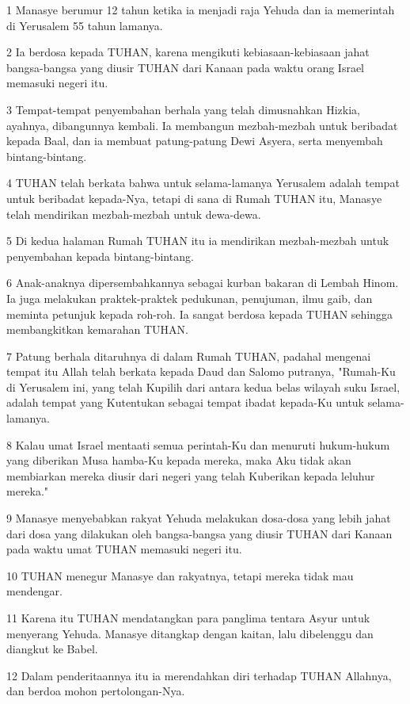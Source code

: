 \par 1 Manasye berumur 12 tahun ketika ia menjadi raja Yehuda dan ia memerintah di Yerusalem 55 tahun lamanya.
\par 2 Ia berdosa kepada TUHAN, karena mengikuti kebiasaan-kebiasaan jahat bangsa-bangsa yang diusir TUHAN dari Kanaan pada waktu orang Israel memasuki negeri itu.
\par 3 Tempat-tempat penyembahan berhala yang telah dimusnahkan Hizkia, ayahnya, dibangunnya kembali. Ia membangun mezbah-mezbah untuk beribadat kepada Baal, dan ia membuat patung-patung Dewi Asyera, serta menyembah bintang-bintang.
\par 4 TUHAN telah berkata bahwa untuk selama-lamanya Yerusalem adalah tempat untuk beribadat kepada-Nya, tetapi di sana di Rumah TUHAN itu, Manasye telah mendirikan mezbah-mezbah untuk dewa-dewa.
\par 5 Di kedua halaman Rumah TUHAN itu ia mendirikan mezbah-mezbah untuk penyembahan kepada bintang-bintang.
\par 6 Anak-anaknya dipersembahkannya sebagai kurban bakaran di Lembah Hinom. Ia juga melakukan praktek-praktek pedukunan, penujuman, ilmu gaib, dan meminta petunjuk kepada roh-roh. Ia sangat berdosa kepada TUHAN sehingga membangkitkan kemarahan TUHAN.
\par 7 Patung berhala ditaruhnya di dalam Rumah TUHAN, padahal mengenai tempat itu Allah telah berkata kepada Daud dan Salomo putranya, "Rumah-Ku di Yerusalem ini, yang telah Kupilih dari antara kedua belas wilayah suku Israel, adalah tempat yang Kutentukan sebagai tempat ibadat kepada-Ku untuk selama-lamanya.
\par 8 Kalau umat Israel mentaati semua perintah-Ku dan menuruti hukum-hukum yang diberikan Musa hamba-Ku kepada mereka, maka Aku tidak akan membiarkan mereka diusir dari negeri yang telah Kuberikan kepada leluhur mereka."
\par 9 Manasye menyebabkan rakyat Yehuda melakukan dosa-dosa yang lebih jahat dari dosa yang dilakukan oleh bangsa-bangsa yang diusir TUHAN dari Kanaan pada waktu umat TUHAN memasuki negeri itu.
\par 10 TUHAN menegur Manasye dan rakyatnya, tetapi mereka tidak mau mendengar.
\par 11 Karena itu TUHAN mendatangkan para panglima tentara Asyur untuk menyerang Yehuda. Manasye ditangkap dengan kaitan, lalu dibelenggu dan diangkut ke Babel.
\par 12 Dalam penderitaannya itu ia merendahkan diri terhadap TUHAN Allahnya, dan berdoa mohon pertolongan-Nya.
